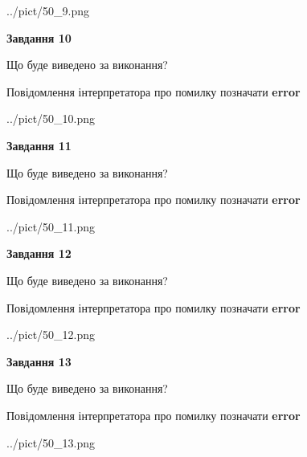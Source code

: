 \documentclass[11pt, ukrainian]{article}
\begin{document}
{\begin {large}
\begin{center}
	{../pict/50_9.png}
\end{center}
\newpage

{\begin {center}\textbf{Завдання 10}\end {center}}\par
Що буде виведено за виконання? \par
Повідомлення інтерпретатора про помилку позначати \textbf{error}

\begin{center}
	{../pict/50_10.png}
\end{center}
\newpage

{\begin {center}\textbf{Завдання 11}\end {center}}\par
Що буде виведено за виконання? \par
Повідомлення інтерпретатора про помилку позначати \textbf{error}

\begin{center}
	{../pict/50_11.png}
\end{center}
\newpage

{\begin {center}\textbf{Завдання 12}\end {center}}\par
Що буде виведено за виконання? \par
Повідомлення інтерпретатора про помилку позначати \textbf{error}

\begin{center}
	{../pict/50_12.png}
\end{center}
\newpage

{\begin {center}\textbf{Завдання 13}\end {center}}\par
Що буде виведено за виконання? \par
Повідомлення інтерпретатора про помилку позначати \textbf{error}

\begin{center}
	{../pict/50_13.png}
\end{center}
\newpage


\end{large}}
\end{document}
